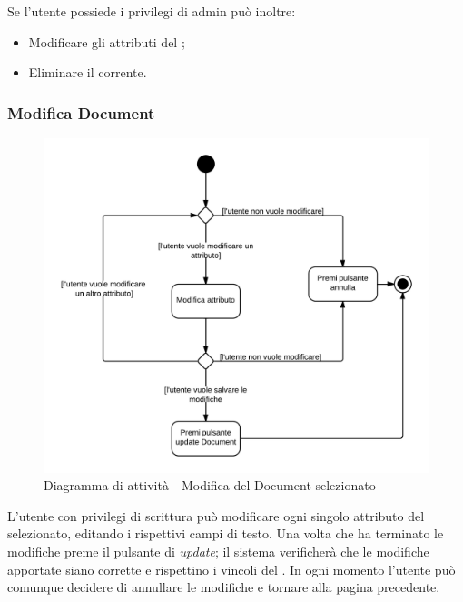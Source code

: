 Se l'utente possiede i privilegi di admin può inoltre:

\begin{itemize}

	\item Modificare gli attributi del ;
	\item Eliminare il  corrente.

\end{itemize}

\subsubsection{Modifica Document}

\begin{figure}[H]
\centering
\includegraphics[scale=0.2]{uml/MaaP - Modifica Document.png}
\caption{Diagramma di attività - Modifica del Document selezionato}
\end{figure}

L'utente con privilegi di scrittura può modificare ogni singolo attributo del  selezionato, editando i rispettivi campi di testo. Una volta che ha terminato le modifiche preme il pulsante di \textit{update}; il sistema  verificherà che le modifiche apportate siano corrette e rispettino i vincoli del . In ogni momento l'utente può comunque decidere di annullare le modifiche e tornare alla pagina precedente.
